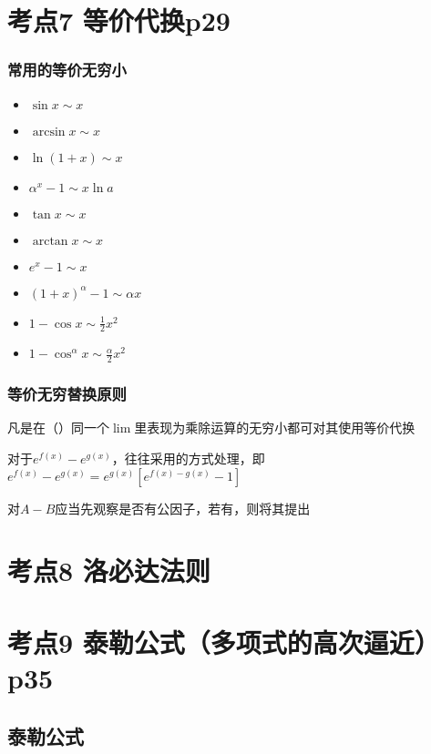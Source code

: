 \section{考点7 等价代换p29}

\subsubsection{常用的等价无穷小}

\begin{multicols}{4}
\begin{itemize}
    \item $ \sin x\sim x $
    \item $ \arcsin x\sim x $
    \item $ \ln (1+x)\sim x $
    \item $ \alpha^{x}-1\sim x\ln a $
    \item $ \tan x\sim x $
    \item $ \arctan x\sim x $
    \item $ e^{x}-1\sim x $
    \item $ (1+x)^{\alpha}-1\sim \alpha x $
    \item $ 1-\cos x\sim \frac{1}{2}x^{2} $
    \item $ 1-\cos^{\alpha} x\sim \frac{\alpha}{2}x^{2} $
    \end{itemize}
\end{multicols}

\subsubsection{等价无穷替换原则}

凡是在（）同一个$\lim$里表现为乘除运算的无穷小都可对其使用等价代换

对于$e^{f(x)}-e^{g(x)}$，往往采用的方式处理，即$e^{f(x)}-e^{g(x)}=e^{g(x)}[e^{f(x)-g(x)}-1]$

对$A-B$应当先观察是否有公因子，若有，则将其提出

\section{考点8 洛必达法则}

\section{考点9 泰勒公式（多项式的高次逼近）p35}

\subsection{泰勒公式}

